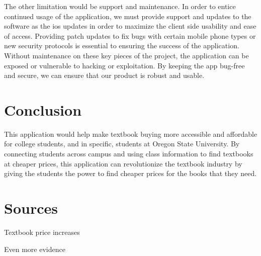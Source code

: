 \documentclass[12pt]{article}
\begin{document}
The other limitation would be support and maintenance. In order to entice continued usage of the application, we must provide support and updates to the software as the ios updates in order to maximize the client side usability and ease of access. Providing patch updates to fix bugs with certain mobile phone types or new security protocols is essential to ensuring the success of the application. Without maintenance on these key pieces of the project, the application can be exposed or vulnerable to hacking or exploitation. By keeping the app bug-free and secure, we can ensure that our product is robust and usable.


\section{Conclusion}
This application would help make textbook buying more accessible and affordable for college students, and in specific, students at Oregon State University. By connecting students across campus and using class information to find textbooks at cheaper prices, this application can revolutionize the textbook industry by giving the students the power to find cheaper prices for the books that they need.



\section{Sources}
Textbook price increases~\cite{bookhuff}

Even more evidence~\cite{booknbc}




\end{document}
